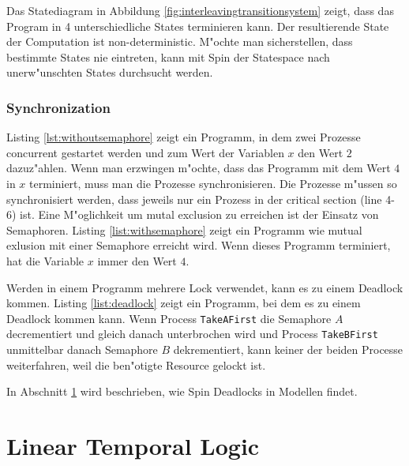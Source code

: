 \documentclass[11pt,twoside,a4paper]{article}
\begin{document}
Das Statediagram in Abbildung \ref{fig:interleavingtransitionsystem} zeigt, dass das Program in 4 unterschiedliche States terminieren kann. Der resultierende State der Computation ist non-deterministic. M"ochte man sicherstellen, dass bestimmte States nie eintreten, kann mit Spin der Statespace nach unerw"unschten States durchsucht werden.

\subsubsection{Synchronization}
\label{sec:synchronization}

Listing \ref{lst:withoutsemaphore} zeigt ein Programm, in dem zwei Prozesse concurrent gestartet werden und zum Wert der Variablen $x$ den Wert $2$ dazuz"ahlen. Wenn man erzwingen m"ochte, dass das Programm mit dem Wert $4$ in $x$ terminiert, muss man die Prozesse synchronisieren. Die Prozesse m"ussen so synchronisiert werden, dass jeweils nur ein Prozess in der critical section (line 4-6) ist. Eine M"oglichkeit um mutal exclusion zu erreichen ist der Einsatz von Semaphoren. Listing \ref{list:withsemaphore} zeigt ein Programm wie mutual exlusion mit einer Semaphore erreicht wird. Wenn dieses Programm terminiert, hat die Variable $x$ immer den Wert $4$.





Werden in einem Programm mehrere Lock verwendet, kann es zu einem Deadlock kommen. Listing \ref{list:deadlock} zeigt ein Programm, bei dem es zu einem Deadlock kommen kann. Wenn Process \verbTakeAFirst die Semaphore $A$ decrementiert und gleich danach unterbrochen wird und Process \verbTakeBFirst unmittelbar danach Semaphore $B$ dekrementiert, kann keiner der beiden Processe weiterfahren, weil die ben"otigte Resource gelockt ist.

In Abschnitt \ref{sec:ltl} wird beschrieben, wie Spin Deadlocks in Modellen findet.



\section{Linear Temporal Logic}
\label{sec:ltl}
\end{document}
